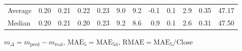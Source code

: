 \begin{threeparttable}
{\begin{tabular}{lrrrrrrrrrrr}
Average &          0.20 &          0.21 &          0.22 &        0.23 &                 9.0 &                 9.2 &       -0.1 &                 0.1 &              2.9 &            0.35 &                  47.17 \\
 Median &          0.20 &          0.21 &          0.20 &        0.23 &                 9.2 &                 8.6 &        0.9 &                 0.1 &              2.6 &            0.31 &                  47.50 \\
\bottomrule
\end{tabular}
}
\begin{tablenotes}\footnotesize
\item $m_\Delta=m_{\text{pred}}-m_{\text{real}}$,
$\mathrm{MAE}_5=\mathrm{MAE}_{5\text{d}}$,
$\mathrm{RMAE}=\mathrm{MAE}_5/\text{Close}$
\end{tablenotes}
\end{threeparttable}
\endgroup


